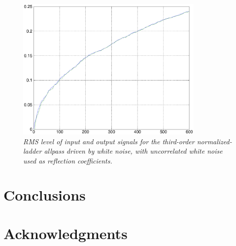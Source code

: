 \documentclass[twoside,a4paper]{article}
\begin{document}
\begin{figure}[ht]
\center
\includegraphics[width=3.6in]{eps/tapnn2.eps}
\caption{\label{tapnn2}{\it RMS level of input and output signals
for the third-order normalized-ladder allpass driven by white noise,
with uncorrelated white noise used as reflection coefficients.}}
\end{figure} 

\section{Conclusions}

\section{Acknowledgments}

{\small\raggedright
\nocite{*}


}
\end{document}
